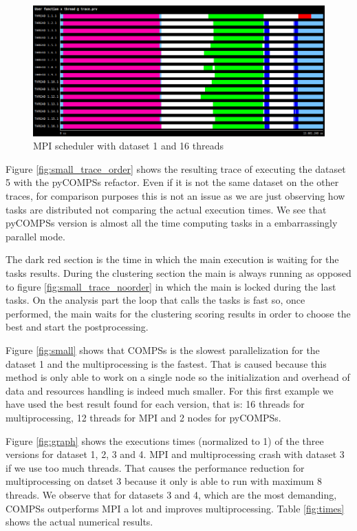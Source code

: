 \begin{figure}[h]
\includegraphics[width=\textwidth]{traces/mpi_16_small.png}
\caption{MPI scheduler with dataset 1 and 16 threads}
\label{tra:mpi16small}
\end{figure}

Figure \ref{fig:small_trace_order} shows the resulting trace of executing the dataset 5 with the pyCOMPSs refactor.  Even if it is not the same dataset on the other traces, for comparison purposes this is not an issue as we are just observing how tasks are distributed not comparing the actual execution times.  We see that pyCOMPSs version is almost all the time computing tasks in a embarrassingly parallel mode. 

The dark red section is the time in which the main execution is waiting for the tasks results. During the clustering section the main is always running as opposed to figure \ref{fig:small_trace_noorder} in which the main is locked during the last tasks. On the analysis part the loop that calls the tasks is fast so, once performed, the main waits for the clustering scoring results in order to choose the best and start the postprocessing.


Figure \ref{fig:small} shows that COMPSs is the slowest parallelization for the dataset 1 and the multiprocessing is the fastest. That is caused because this method is only able to work on a single node so the initialization and overhead of data and resources handling is indeed much smaller. For this first example we have used the best result found for each version, that is: 16 threads for multiprocessing, 12 threads for MPI and 2 nodes for pyCOMPSs.

 Figure \ref{fig:graph} shows the executions times (normalized to 1) of the three versions for dataset 1, 2, 3 and 4. MPI and multiprocessing crash with dataset 3 if we use too much threads. That causes the performance reduction for multiprocessing on datset 3 because it only is able to run with maximum 8 threads. We observe that for  datasets 3 and 4, which are the most demanding, COMPSs outperforms MPI a lot and improves multiprocessing. Table \ref{fig:times} shows the actual numerical results.



